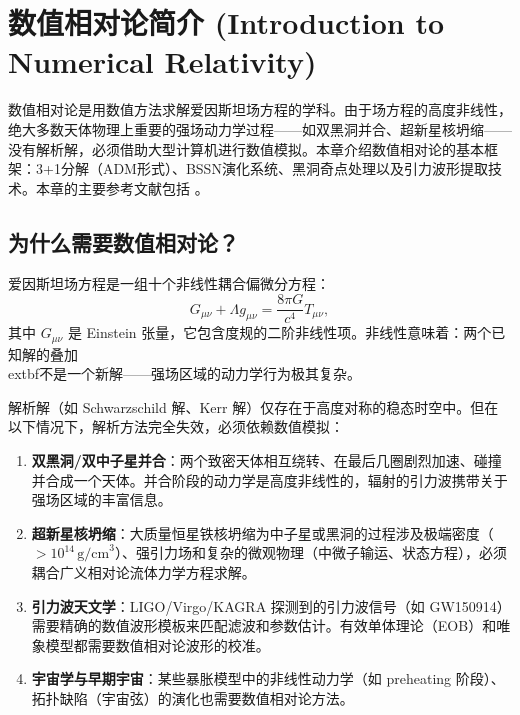 \chapter{数值相对论简介 (Introduction to Numerical Relativity)}
\label{chap:numerical_relativity}

数值相对论是用数值方法求解爱因斯坦场方程的学科。由于场方程的高度非线性，绝大多数天体物理上重要的强场动力学过程——如双黑洞并合、超新星核坍缩——没有解析解，必须借助大型计算机进行数值模拟。本章介绍数值相对论的基本框架：3+1分解（ADM形式）、BSSN演化系统、黑洞奇点处理以及引力波形提取技术。本章的主要参考文献包括 \cite{Gourgoulhon2007,Carroll1997,Wald1984}。

\section{为什么需要数值相对论？}
\label{sec:why_numerical_relativity}

爱因斯坦场方程是一组十个非线性耦合偏微分方程：
\begin{equation}
    G_{\mu\nu} + \Lambda g_{\mu\nu} = \frac{8\pi G}{c^4} T_{\mu\nu},
    \label{eq:Einstein_full}
\end{equation}
其中 $G_{\mu\nu}$ 是 Einstein 张量，它包含度规的二阶非线性项。非线性意味着：两个已知解的叠加\\
	extbf{不是}一个新解——强场区域的动力学行为极其复杂。

解析解（如 Schwarzschild 解、Kerr 解）仅存在于高度对称的稳态时空中。但在以下情况下，解析方法完全失效，必须依赖数值模拟：

\begin{enumerate}
    \item \textbf{双黑洞/双中子星并合}：两个致密天体相互绕转、在最后几圈剧烈加速、碰撞并合成一个天体。并合阶段的动力学是高度非线性的，辐射的引力波携带关于强场区域的丰富信息。
    \item \textbf{超新星核坍缩}：大质量恒星铁核坍缩为中子星或黑洞的过程涉及极端密度（$>10^{14}\,\text{g/cm}^3$）、强引力场和复杂的微观物理（中微子输运、状态方程），必须耦合广义相对论流体力学方程求解。
    \item \textbf{引力波天文学}：LIGO/Virgo/KAGRA 探测到的引力波信号（如 GW150914）需要精确的数值波形模板来匹配滤波和参数估计。有效单体理论（EOB）和唯象模型都需要数值相对论波形的校准。
    \item \textbf{宇宙学与早期宇宙}：某些暴胀模型中的非线性动力学（如 preheating 阶段）、拓扑缺陷（宇宙弦）的演化也需要数值相对论方法。
\end{enumerate}

